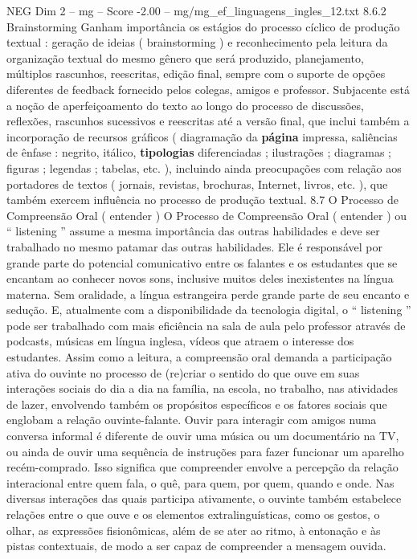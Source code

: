 \begin{textsample}{NEG Dim 2 – mg – Score -2.00 – mg/mg\_ef\_linguagens\_ingles\_12.txt}  \label{ex:f2_neg_092}
8.6.2 Brainstorming Ganham importância os estágios do processo cíclico de produção textual : geração de ideias ( brainstorming ) e reconhecimento pela leitura da organização textual do mesmo gênero que será produzido, planejamento, múltiplos rascunhos, reescritas, edição final, sempre com o suporte de opções diferentes de feedback fornecido pelos colegas, amigos e professor.
Subjacente está a noção de aperfeiçoamento do texto ao longo do processo de discussões, reflexões, rascunhos sucessivos e reescritas até a versão final, que inclui também a incorporação de recursos gráficos ( diagramação da \textbf{página} impressa, saliências de ênfase : negrito, itálico, \textbf{tipologias} diferenciadas ; ilustrações ; diagramas ; figuras ; legendas ; tabelas, etc. ), incluindo ainda preocupações com relação aos portadores de textos ( jornais, revistas, brochuras, Internet, livros, etc. ), que também exercem influência no processo de produção textual. 8.7 O Processo de Compreensão Oral ( entender ) O Processo de Compreensão Oral ( entender ) ou “ listening ” assume a mesma importância das outras habilidades e deve ser trabalhado no mesmo patamar das outras habilidades.
Ele é responsável por grande parte do potencial comunicativo entre os falantes e os estudantes que se encantam ao conhecer novos sons, inclusive muitos deles inexistentes na língua materna.
Sem oralidade, a língua estrangeira perde grande parte de seu encanto e sedução.
E, atualmente com a disponibilidade da tecnologia digital, o “ listening ” pode ser trabalhado com mais eficiência na sala de aula pelo professor através de podcasts, músicas em língua inglesa, vídeos que atraem o interesse dos estudantes.
Assim como a leitura, a compreensão oral demanda a participação ativa do ouvinte no processo de (re)criar o sentido do que ouve em suas interações sociais do dia a dia na família, na escola, no trabalho, nas atividades de lazer, envolvendo também os propósitos específicos e os fatores sociais que englobam a relação ouvinte-falante.
Ouvir para interagir com amigos numa conversa informal é diferente de ouvir uma música ou um documentário na TV, ou ainda de ouvir uma sequência de instruções para fazer funcionar um aparelho recém-comprado.
Isso significa que compreender envolve a percepção da relação interacional entre quem fala, o quê, para quem, por quem, quando e onde.
Nas diversas interações das quais participa ativamente, o ouvinte também estabelece relações entre o que ouve e os elementos extralinguísticas, como os gestos, o olhar, as expressões fisionômicas, além de se ater ao ritmo, à entonação e às pistas contextuais, de modo a ser capaz de compreender a mensagem ouvida.

\end{textsample}
